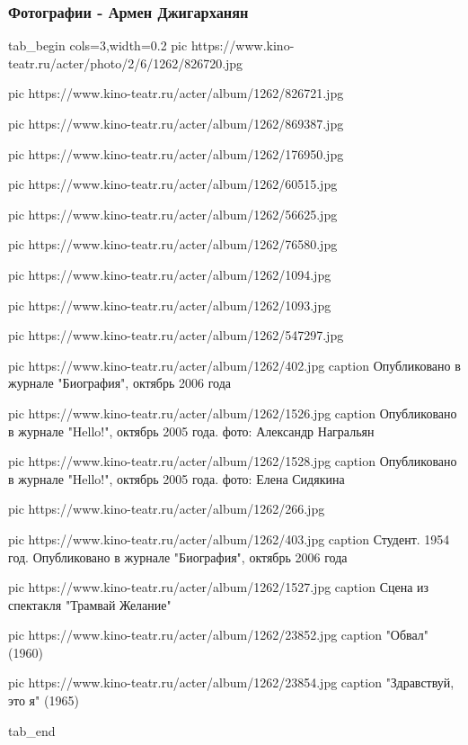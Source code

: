  
 
 

\subsubsection{Фотографии - Армен Джигарханян}

\ifcmt
tab_begin cols=3,width=0.2
  pic https://www.kino-teatr.ru/acter/photo/2/6/1262/826720.jpg
  
  pic https://www.kino-teatr.ru/acter/album/1262/826721.jpg
  
  pic https://www.kino-teatr.ru/acter/album/1262/869387.jpg
  
  pic https://www.kino-teatr.ru/acter/album/1262/176950.jpg
  
  pic https://www.kino-teatr.ru/acter/album/1262/60515.jpg
  
  pic https://www.kino-teatr.ru/acter/album/1262/56625.jpg
  
  pic https://www.kino-teatr.ru/acter/album/1262/76580.jpg
  
  pic https://www.kino-teatr.ru/acter/album/1262/1094.jpg
  
  pic https://www.kino-teatr.ru/acter/album/1262/1093.jpg
  
  pic https://www.kino-teatr.ru/acter/album/1262/547297.jpg

  pic https://www.kino-teatr.ru/acter/album/1262/402.jpg
  caption Опубликовано в журнале "Биография", октябрь 2006 года

  pic https://www.kino-teatr.ru/acter/album/1262/1526.jpg
  caption Опубликовано в журнале "Hello!", октябрь 2005 года. фото: Александр Награльян

  pic https://www.kino-teatr.ru/acter/album/1262/1528.jpg
  caption Опубликовано в журнале "Hello!", октябрь 2005 года. фото: Елена Сидякина

  pic https://www.kino-teatr.ru/acter/album/1262/266.jpg

  pic https://www.kino-teatr.ru/acter/album/1262/403.jpg
  caption Студент. 1954 год. Опубликовано в журнале "Биография", октябрь 2006 года

  pic https://www.kino-teatr.ru/acter/album/1262/1527.jpg
  caption Сцена из спектакля "Трамвай Желание"

  pic https://www.kino-teatr.ru/acter/album/1262/23852.jpg
  caption "Обвал" (1960) 

  pic https://www.kino-teatr.ru/acter/album/1262/23854.jpg
  caption "Здравствуй, это я" (1965)

tab_end
\fi

